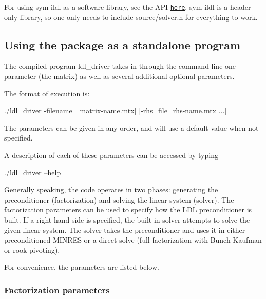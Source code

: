 For using sym-\/ildl as a software library, see the A\+PI \href{http://www.cs.ubc.ca/~inutard/html/classsolver.html}{\tt here}. sym-\/ildl is a header only library, so one only needs to include {\ttfamily \hyperlink{solver_8h_source}{source/solver.\+h}} for everything to work.\hypertarget{index_ldl_driver}{}\subsection{Using the package as a standalone program}\label{index_ldl_driver}
The compiled program {\ttfamily ldl\+\_\+driver} takes in through the command line one parameter (the matrix) as well as several additional optional parameters.

The format of execution is\+: 
\begin{DoxyCode}
./ldl\_driver -filename=[matrix-name.mtx] [-rhs\_file=rhs-name.mtx ...]
\end{DoxyCode}


The parameters can be given in any order, and will use a default value when not specified.

A description of each of these parameters can be accessed by typing 
\begin{DoxyCode}
./ldl\_driver --help 
\end{DoxyCode}


Generally speaking, the code operates in two phases\+: generating the preconditioner (factorization) and solving the linear system (solver). The factorization parameters can be used to specify how the L\+DL\textquotesingle{} preconditioner is built. If a right hand side is specified, the built-\/in solver attempts to solve the given linear system. The solver takes the preconditioner and uses it in either preconditioned M\+I\+N\+R\+ES or a direct solve (full factorization with Bunch-\/\+Kaufman or rook pivoting).

For convenience, the parameters are listed below.\hypertarget{index_fact_param}{}\subsubsection{Factorization parameters}\label{index_fact_param}

